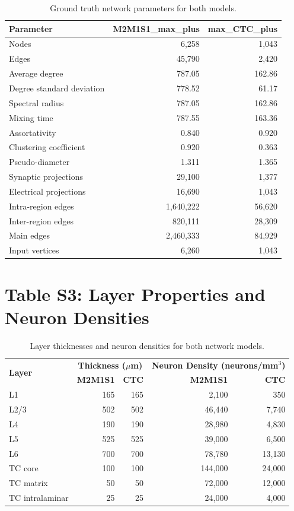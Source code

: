 \documentclass[10pt]{article}
\begin{document}
\begin{table}[h]
\centering
\caption{Ground truth network parameters for both models.}
\begin{tabular}{lrr}
\toprule
\textbf{Parameter} & \textbf{M2M1S1\_max\_plus} & \textbf{max\_CTC\_plus} \\
\midrule
Nodes & 6,258 & 1,043 \\
Edges & 45,790 & 2,420 \\
Average degree & 787.05 & 162.86 \\
Degree standard deviation & 778.52 & 61.17 \\
Spectral radius & 787.05 & 162.86 \\
Mixing time & 787.55 & 163.36 \\
Assortativity & 0.840 & 0.920 \\
Clustering coefficient & 0.920 & 0.363 \\
Pseudo-diameter & 1.311 & 1.365 \\
Synaptic projections & 29,100 & 1,377 \\
Electrical projections & 16,690 & 1,043 \\
Intra-region edges & 1,640,222 & 56,620 \\
Inter-region edges & 820,111 & 28,309 \\
Main edges & 2,460,333 & 84,929 \\
Input vertices & 6,260 & 1,043 \\
\bottomrule
\end{tabular}
\end{table}

\section*{Table S3: Layer Properties and Neuron Densities}

\begin{table}[h]
\centering
\caption{Layer thicknesses and neuron densities for both network models.}
\begin{tabular}{lrrrr}
\toprule
\multirow{2}{*}{\textbf{Layer}} & \multicolumn{2}{c}{\textbf{Thickness ($\mu$m)}} & \multicolumn{2}{c}{\textbf{Neuron Density (neurons/mm$^3$)}} \\
& \textbf{M2M1S1} & \textbf{CTC} & \textbf{M2M1S1} & \textbf{CTC} \\
\midrule
L1 & 165 & 165 & 2,100 & 350 \\
L2/3 & 502 & 502 & 46,440 & 7,740 \\
L4 & 190 & 190 & 28,980 & 4,830 \\
L5 & 525 & 525 & 39,000 & 6,500 \\
L6 & 700 & 700 & 78,780 & 13,130 \\
TC core & 100 & 100 & 144,000 & 24,000 \\
TC matrix & 50 & 50 & 72,000 & 12,000 \\
TC intralaminar & 25 & 25 & 24,000 & 4,000 \\
\bottomrule
\end{tabular}
\end{table}
\end{document}
